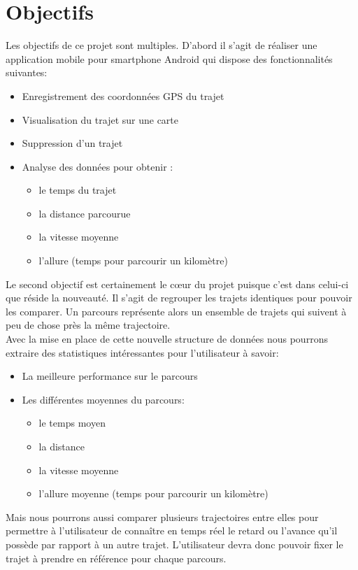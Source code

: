 \chapter{Objectifs}
Les objectifs de ce projet sont multiples. D'abord il s'agit de réaliser une application mobile pour smartphone Android qui dispose des fonctionnalités suivantes:\\

\begin{itemize}
  \item Enregistrement des coordonnées GPS du trajet
  \item Visualisation du trajet sur une carte 
  \item Suppression d'un trajet 
  \item Analyse des données pour obtenir :
  \begin{itemize}
    \item le temps du trajet
    \item la distance parcourue
    \item la vitesse moyenne
    \item l'allure (temps pour parcourir un kilomètre)
  \end{itemize}
\end{itemize}

Le second objectif est certainement le cœur du projet puisque c'est dans celui-ci que réside la nouveauté. Il s'agit de regrouper les trajets identiques pour pouvoir les comparer. Un parcours représente alors un ensemble de trajets qui suivent à peu de chose près la même trajectoire.\\

Avec la mise en place de cette nouvelle structure de données nous pourrons extraire des statistiques intéressantes pour l'utilisateur à savoir:\\

\begin{itemize}
  \item La meilleure performance sur le parcours
  \item Les différentes moyennes du parcours:
  \begin{itemize}
    \item le temps moyen
    \item la distance
    \item la vitesse moyenne
    \item l'allure moyenne (temps pour parcourir un kilomètre)
  \end{itemize}   
\end{itemize}

Mais nous pourrons aussi comparer plusieurs trajectoires entre elles pour permettre à l'utilisateur de connaître en temps réel le retard ou l'avance qu'il possède par rapport à un autre trajet. L'utilisateur devra donc pouvoir fixer le trajet à prendre en référence pour chaque parcours.

